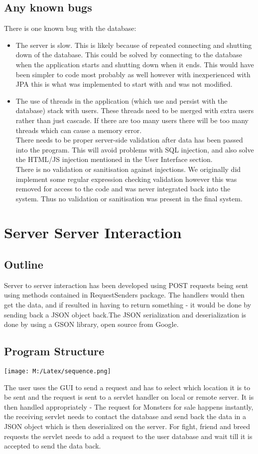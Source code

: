 \documentclass[titlepage]{article}
\begin{document}
{\subsection {Any known bugs}
There is one known bug with the database:
\begin{itemize}
 \item {The server is slow. This is likely because of repeated connecting and shutting down of the database. This could be solved by connecting to the database when the application starts and shutting down when it ends. This would have been simpler to code most probably as well however with inexperienced with JPA this is what was implemented to start with and was not modified.}
\item {    The use of threads in the application (which use and persist with the database) stack with users. These threads need to be merged with extra users rather than just cascade. If there are too many users there will be too many threads which can cause a memory error.}
\\
There needs to be proper server-side validation after data has been passed into the program. This will avoid problems with SQL injection, and also solve the HTML/JS injection mentioned in the User Interface section.
\\
There is no validation or sanitisation against injections. We originally did implement some regular expression checking validation however this was removed for access to the code and was never integrated back into the system. Thus no validation or sanitisation was present in the final system.
\end{itemize}
\section {Server Server Interaction}
\subsection {Outline}
Server to server interaction has been developed using POST requests being sent using methods contained in RequestSenders package. The handlers would then get the data, and if resulted in having to return something - it would be done by sending back a JSON object back.The JSON serialization and deserialization is done by using a GSON library, open source from Google.
\subsection {Program Structure}
\begin{center}
\texttt{[image: M:/Latex/sequence.png]}
\label{fig:pic}
\\
\end{center}
The user uses the GUI to send a request and has to select which location it is to be sent and the request is sent to a servlet handler on local or remote server. It is then handled appropriately - The request for Monsters for sale happens instantly, the receiving servlet needs to contact the database and send back the data in a JSON object which is then deserialized on the server.
For fight, friend and breed requests the servlet needs to add a request to the user database and wait till it is accepted to send the data back.
}
\end{document}
